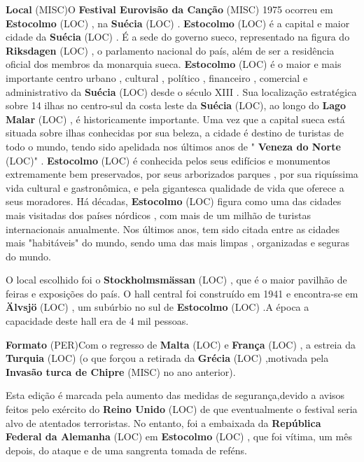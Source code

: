 \documentclass[12pt,a4paper]{article}
\begin{document}
\textbf{Local} (MISC)O \textbf{Festival Eurovisão da Canção} (MISC) 1975 ocorreu em \textbf{Estocolmo} (LOC) , na \textbf{Suécia} (LOC) . \textbf{Estocolmo} (LOC) é a capital e maior cidade da \textbf{Suécia} (LOC) . É a sede do governo sueco, representado na figura do \textbf{Riksdagen} (LOC) , o parlamento nacional do país, além de ser a residência oficial dos membros da monarquia sueca. \textbf{Estocolmo} (LOC) é o maior e mais importante centro urbano , cultural , político , financeiro , comercial e administrativo da \textbf{Suécia} (LOC) desde o século XIII . Sua localização estratégica sobre 14 ilhas no centro-sul da costa leste da \textbf{Suécia} (LOC), ao longo do \textbf{Lago Malar} (LOC) , é historicamente importante. Uma vez que a capital sueca está situada sobre ilhas conhecidas por sua beleza, a cidade é destino de turistas de todo o mundo, tendo sido apelidada nos últimos anos de " \textbf{Veneza do Norte} (LOC)" . \textbf{Estocolmo} (LOC) é conhecida pelos seus edifícios e monumentos extremamente bem preservados, por seus arborizados parques , por sua riquíssima vida cultural e gastronômica, e pela gigantesca qualidade de vida que oferece a seus moradores. Há décadas, \textbf{Estocolmo} (LOC) figura como uma das cidades mais visitadas dos países nórdicos , com mais de um milhão de turistas internacionais anualmente. Nos últimos anos, tem sido citada entre as cidades mais "habitáveis" do mundo, sendo uma das mais limpas , organizadas e seguras do mundo.

O local escolhido foi o \textbf{Stockholmsmässan} (LOC) , que é o maior pavilhão de feiras e exposições do país. O hall central foi construído em 1941 e encontra-se em \textbf{Älvsjö} (LOC) , um subúrbio no sul de \textbf{Estocolmo} (LOC) .A época a capacidade deste hall era de 4 mil pessoas.



\textbf{Formato} (PER)Com o regresso de \textbf{Malta} (LOC) e \textbf{França} (LOC) , a estreia da \textbf{Turquia} (LOC) (o que forçou a retirada da \textbf{Grécia} (LOC) ,motivada pela \textbf{Invasão turca de Chipre} (MISC) no ano anterior).

Esta edição é marcada pela aumento das medidas de segurança,devido a avisos feitos pelo exército do \textbf{Reino Unido} (LOC) de que eventualmente o festival seria alvo de atentados terroristas. No entanto, foi a embaixada da \textbf{República Federal da Alemanha} (LOC) em \textbf{Estocolmo} (LOC) , que foi vítima, um mês depois, do ataque e de uma sangrenta tomada de reféns.
\end{document}
